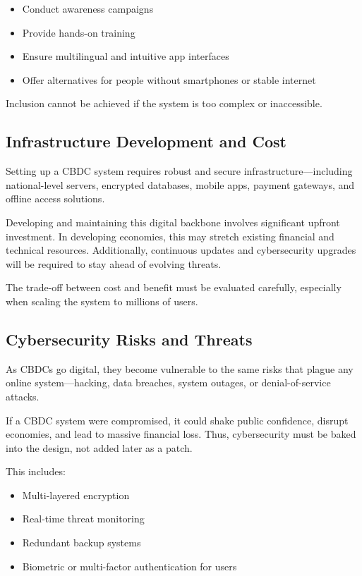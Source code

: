 \begin{itemize}
    \item Conduct awareness campaigns
    \item Provide hands-on training
    \item Ensure multilingual and intuitive app interfaces
    \item Offer alternatives for people without smartphones or stable internet
\end{itemize}

Inclusion cannot be achieved if the system is too complex or inaccessible.

\subsection{Infrastructure Development and Cost}
Setting up a CBDC system requires robust and secure infrastructure—including national-level servers, encrypted databases, mobile apps, payment gateways, and offline access solutions.

Developing and maintaining this digital backbone involves significant upfront investment. In developing economies, this may stretch existing financial and technical resources. Additionally, continuous updates and cybersecurity upgrades will be required to stay ahead of evolving threats.

The trade-off between cost and benefit must be evaluated carefully, especially when scaling the system to millions of users.

\subsection{Cybersecurity Risks and Threats}
As CBDCs go digital, they become vulnerable to the same risks that plague any online system—hacking, data breaches, system outages, or denial-of-service attacks.

If a CBDC system were compromised, it could shake public confidence, disrupt economies, and lead to massive financial loss. Thus, cybersecurity must be baked into the design, not added later as a patch.

This includes:

\begin{itemize}
    \item Multi-layered encryption
    \item Real-time threat monitoring
    \item Redundant backup systems
    \item Biometric or multi-factor authentication for users
\end{itemize}


